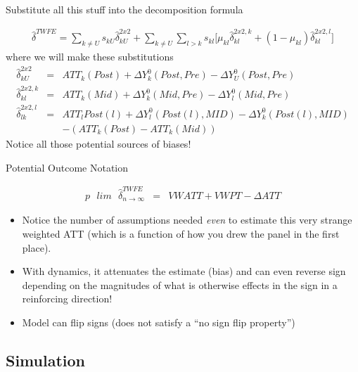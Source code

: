\documentclass{beamer}
\begin{document}
\begin{frame}{Substitute all this stuff into the decomposition formula}

\begin{eqnarray*}	
\widehat{\delta}^{TWFE} = \sum_{k \neq U} s_{kU}\widehat{\delta}_{kU}^{2x2} + \sum_{k \neq U} \sum_{l>k} s_{kl}  \bigg [ \mu_{kl}\widehat{\delta}_{kl}^{2x2,k} + (1-\mu_{kl}) \widehat{\delta}_{kl}^{2x2,l} \bigg]
\end{eqnarray*}where we will make these substitutions\begin{eqnarray*}
\widehat{\delta}_{kU}^{2x2} &=& ATT_k(Post) + \Delta Y_k^0(Post,Pre) - \Delta Y_U^0(Post, Pre) \\
\widehat{\delta}_{kl}^{2x2,k} &=& ATT_k(Mid) + \Delta Y_k^0(Mid,Pre) - \Delta Y_l^0(Mid, Pre) \\
\widehat{\delta}^{2x2,l}_{lk} &=& ATT_{l}Post(l) + \Delta Y^0_l(Post(l),MID) - \Delta Y^0_k ( Post(l), MID) \\
&&- (ATT_k(Post) - ATT_k(Mid))
\end{eqnarray*}Notice all those potential sources of biases! 

\end{frame}


\begin{frame}{Potential Outcome Notation}

\begin{eqnarray*}
p\text{ }lim\text{ } \widehat{\delta}^{TWFE}_{n\to\infty} &=& VWATT + VWPT - \Delta ATT
\end{eqnarray*}

\begin{itemize}
\item Notice the number of assumptions needed \emph{even} to estimate this very strange weighted ATT (which is a function of how you drew the panel in the first place). 
\item With dynamics, it attenuates the estimate (bias) and can even reverse sign depending on the magnitudes of what is otherwise effects in the sign in a reinforcing direction! 
\item Model can flip signs (does not satisfy a ``no sign flip property'')
\end{itemize}

\end{frame}



\subsection{Simulation}
\end{document}
